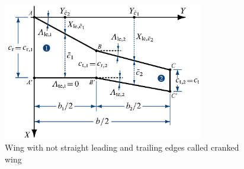 \documentclass[[12pt,twoside]{book}
\begin{document}
%
\begin{figure}[t]%
  \centering
    \includegraphics[width=0.78\textwidth]{Chapter_2/geometric_characteristics_of_a_cranked_wing/cranked_wing.pdf}%
  \caption{
           Wing with not straight leading and trailing edges called cranked wing}
  \label{fig:Cranked:Wing}%
\end{figure}
%

%
\end{document}
